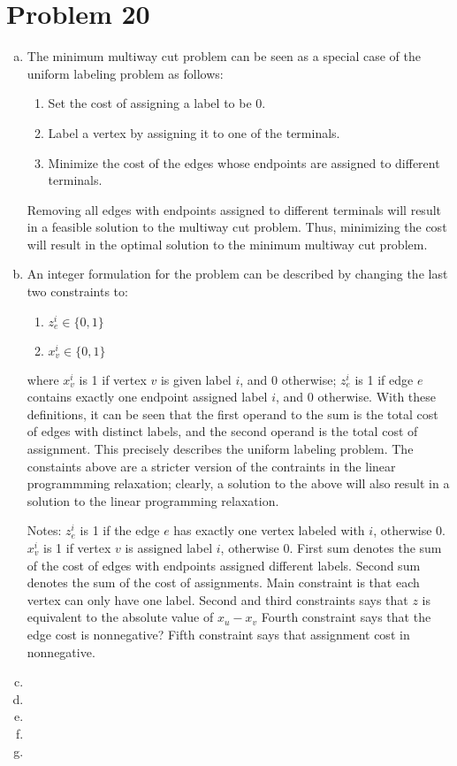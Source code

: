 \documentclass{article}[12pt]
\begin{document}
\section{Problem 20}
\begin{enumerate}[(a)]
\item The minimum multiway cut problem can be seen as a special case of the uniform labeling problem as follows:
	\begin{enumerate}[1.]
    	\item Set the cost of assigning a label to be 0.
        \item Label a vertex by assigning it to one of the terminals.
        \item Minimize the cost of the edges whose endpoints are assigned to different terminals.
    \end{enumerate}
Removing all edges with endpoints assigned to different terminals will result in a feasible solution to the multiway cut problem. Thus, minimizing the cost will result in the optimal solution to the minimum multiway cut problem.
\item An integer formulation for the problem can be described by changing the last two constraints to:
\begin{enumerate}[1.]
	\item $z_{e}^{i} \in \{0, 1\}$
    \item $x_{v}^{i} \in \{0, 1\}$
\end{enumerate}
where $x_{v}^{i}$ is 1 if vertex $v$ is given label $i$, and 0 otherwise; $z_{e}^{i}$ is 1 if edge $e$ contains exactly one endpoint assigned label $i$, and 0 otherwise. With these definitions, it can be seen that the first operand to the sum is the total cost of edges with distinct labels, and the second operand is the total cost of assignment. This precisely describes the uniform labeling problem. The constaints above are a stricter version of the contraints in the linear programmming relaxation; clearly, a solution to the above will also result in a solution to the linear programming relaxation.


Notes:
$z_{e}^{i}$ is 1 if the edge $e$ has exactly one vertex labeled with $i$, otherwise 0. $x_{v}^{i}$ is 1 if vertex $v$ is assigned label $i$, otherwise 0. First sum denotes the sum of the cost of edges with endpoints assigned different labels. Second sum denotes the sum of the cost of assignments. Main constraint is that each vertex can only have one label. Second and third constraints says that $z$ is equivalent to the absolute value of $x_{u} - x_{v}$ Fourth constraint says that the edge cost is nonnegative? Fifth constraint says that assignment cost in nonnegative.
\item
\item
\item
\item
\item
\end{enumerate}
\end{document}
